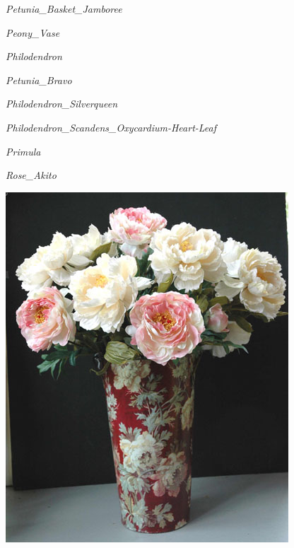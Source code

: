 \documentclass{article}
\begin{document}
\noindent
\vfill
\centerline{{\Large\emph{Petunia_Basket_Jamboree}}}
\vfill
\newpage

\noindent
\vfill
\centerline{{\Large\emph{Peony_Vase}}}
\vfill
\newpage

\noindent
\vfill
\centerline{{\Large\emph{Philodendron}}}
\vfill
\newpage

\noindent
\vfill
\centerline{{\Large\emph{Petunia_Bravo}}}
\vfill
\newpage

\noindent
\vfill
\centerline{{\Large\emph{Philodendron_Silverqueen}}}
\vfill
\newpage

\noindent
\vfill
\centerline{{\Large\emph{Philodendron_Scandens_Oxycardium-Heart-Leaf}}}
\vfill
\newpage

\noindent
\vfill
\centerline{{\Large\emph{Primula}}}
\vfill
\newpage

\noindent
\vfill
\centerline{{\Large\emph{Rose_Akito}}}
\vfill
\newpage

\begin{center}
\includegraphics[height=0.9\textheight, angle=90]{../Peony_Vase.jpg}
\end{center}
\newpage
\end{document}
